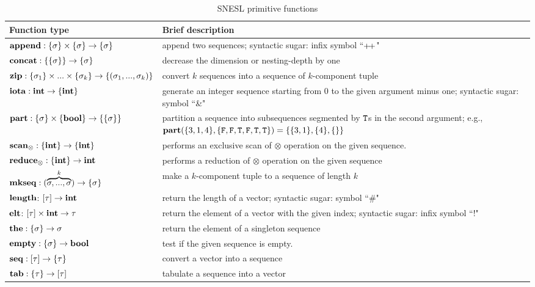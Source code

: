 \begin{table}\large
	\renewcommand\arraystretch{1.5}
	\centering
	\begin{tabular}{|p{}|p{}|}
		\hline
		Function type & Brief description  \\ \hline
		$\mathbf{append : \{\sigma\} \times \{\sigma\} \rightarrow \{\sigma\}}$ & append two sequences; syntactic sugar: infix symbol ``${\++}$" \\ \hline
		$\mathbf{concat: \{\{\sigma\}\} \rightarrow \{\sigma\} }$ &  decrease the dimension or nesting-depth by one                    \\ \hline
		$\mathbf{zip}: \{\sigma_1\} \times ... \times \{\sigma_k\}  \rightarrow \{(\sigma_1,...,\sigma_k)\}$ & convert $k$ sequences into a sequence of $k$-component tuple \\ \hline
		$\mathbf{iota: \mathbf{int} \rightarrow \{\mathbf{int}\}}$  &  generate an integer sequence starting from 0 to the given argument minus one; syntactic sugar: symbol ``\&"    \\ \hline
		$\mathbf{part: \{\sigma\} \times \{\mathbf{bool}\} \rightarrow  \{\{\sigma\}\}}$   & partition a sequence into subsequences segmented by $\mathtt{T}$s in the second argument; e.g., $\mathbf{part}(\{3,1,4\}, \{\mathtt{F},\mathtt{F},\mathtt{T},\mathtt{F},\mathtt{T},\mathtt{T}\}) = \{\{3,1\},\{4\},\{\}\}$                \\ \hline
		$\mathbf{scan_\otimes}: \{\mathbf{int}\} \rightarrow \{\mathbf{int}\}$     &  performs an exclusive scan of $\otimes$ operation on the given sequence.    \\ \hline
		$\mathbf{reduce_\otimes: \{\mathbf{int}\} \rightarrow \mathbf{int} }$     &   performs a reduction of $\otimes$ operation on the given sequence             \\ \hline
		$\mathbf{mkseq}: (\overbrace{\sigma,...,\sigma}^{k}) \rightarrow \{\sigma\}$  & make a $k$-component tuple to a sequence of length $k$ \\ \hline  
	    $\mathbf{length}$: $[\tau] \rightarrow \mathbf{int}$ & return the length of a vector; syntactic sugar: symbol ``\#" \\ \hline  
	    $\mathbf{elt}$: $[\tau] \times \mathbf{int} \rightarrow \tau$  & return the  element of a vector with the given index; syntactic sugar: infix symbol ``!" \\ \hline  
	    $\mathbf{the:  \{\sigma\} \rightarrow \sigma}$     &     return the element of a singleton sequence           \\ \hline
	    $\mathbf{empty:  \{\sigma\} \rightarrow \mathbf{bool}}$       & test if the given sequence is empty.             \\ \hline  
	    $\mathbf{seq}: [\tau] \rightarrow \{\tau\} $  & convert a vector into a sequence \\ \hline  
	    $\mathbf{tab}: \{\tau\} \rightarrow [\tau] $  & tabulate a sequence into a vector\\ \hline  
	\end{tabular}
	\caption{SNESL primitive functions}
	\label{tab:snesl-funcs}
\end{table}




